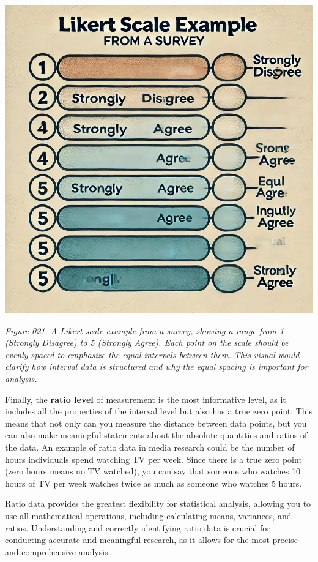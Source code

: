 \documentclass[
]{book}
\begin{document}
\includegraphics[width=1\textwidth,height=\textheight]{images/fig021.jpg}

\emph{Figure 021. A Likert scale example from a survey, showing a range from 1 (Strongly Disagree) to 5 (Strongly Agree). Each point on the scale should be evenly spaced to emphasize the equal intervals between them. This visual would clarify how interval data is structured and why the equal spacing is important for analysis.}

Finally, the \textbf{ratio level} of measurement is the most informative level, as it includes all the properties of the interval level but also has a true zero point. This means that not only can you measure the distance between data points, but you can also make meaningful statements about the absolute quantities and ratios of the data. An example of ratio data in media research could be the number of hours individuals spend watching TV per week. Since there is a true zero point (zero hours means no TV watched), you can say that someone who watches 10 hours of TV per week watches twice as much as someone who watches 5 hours.

Ratio data provides the greatest flexibility for statistical analysis, allowing you to use all mathematical operations, including calculating means, variances, and ratios. Understanding and correctly identifying ratio data is crucial for conducting accurate and meaningful research, as it allows for the most precise and comprehensive analysis.
\end{document}
